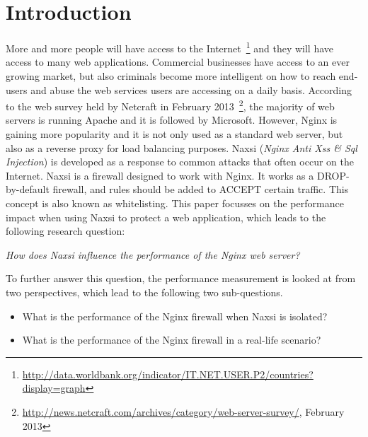 \documentclass[Introduction]{subfiles}
\begin{document}
\section{Introduction}
\label{sec:Introduction}
More and more people will have access to the Internet~\footnote{\url{http://data.worldbank.org/indicator/IT.NET.USER.P2/countries?display=graph}} and they will have access to many web applications. Commercial businesses have access to an ever growing market, but also criminals become more intelligent on how to reach end-users and abuse the web services users are accessing on a daily basis.
According to the web survey held by Netcraft in February 2013~\footnote{\url{http://news.netcraft.com/archives/category/web-server-survey/}, February 2013}, the majority of web servers is running Apache and it is followed by Microsoft. However, Nginx is gaining more popularity and it is not only used as a standard web server, but also as a reverse proxy for load balancing purposes. Naxsi (\emph{Nginx Anti Xss \& Sql Injection}) is developed as a response to common attacks that often occur on the Internet. Naxsi is a firewall designed to work with Nginx. It works as a DROP-by-default firewall, and rules should be added to ACCEPT certain traffic. This concept is also known as whitelisting. This paper focusses on the performance impact when using Naxsi to protect a web application, which leads to the following research question:


\begin{center}
\emph{How does Naxsi influence the performance of the Nginx web server?} 
\end{center}

\noindent
To further answer this question, the performance measurement is looked at from two perspectives, which lead to the following two sub-questions.

\begin{itemize}
\item What is the performance of the Nginx firewall when Naxsi is isolated?
\item What is the performance of the Nginx firewall in a real-life scenario?
\end{itemize}

\end{document}
